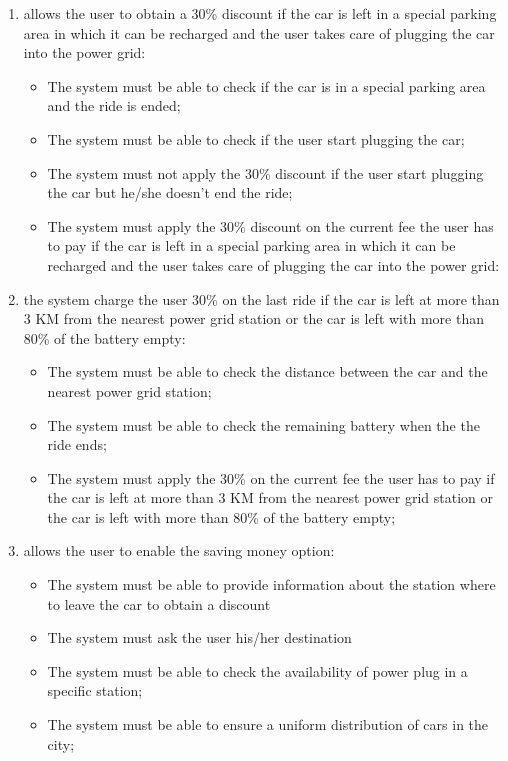 \begin{enumerate}
\item allows the user to obtain a 30\% discount if the car is left in a special parking area in which it can be recharged and the user takes care of plugging the car into the power grid:

\begin{itemize}
\item The system must be able to check if the car is in a special parking area and the ride is ended;
\item The system must be able to check if the user start plugging the car;
\item The system must not apply the 30\% discount if the user start plugging the car but he/she doesn't end the ride;
\item The system must apply the 30\% discount on the current fee the user has to pay if the car is left in a special parking area in which it can be recharged and the user takes care of plugging the car into the power grid:
\end{itemize}

\item the system charge the user 30\% on the last ride if the car is left at more than 3 KM from the nearest power grid station or the car is left with more than 80\% of the battery empty:

\begin{itemize}
\item The system must be able to check the distance between the car and the nearest power grid station;
\item The system must be able to check the remaining battery when the the ride ends;
\item The system must apply the 30\% on the current fee the user has to pay if the car is left at more than 3 KM from the nearest power grid station or the car is left with more than 80\% of the battery empty;
\end{itemize}

\item allows the user to enable the saving money option:

\begin{itemize}
\item The system must be able to provide information about the station where to leave the car to obtain a discount
\item The system must ask the user his/her destination
\item The system must be able to check the availability of power plug in a specific station;
\item The system must be able to ensure a uniform distribution of cars in the city;
\end{itemize}
\end{enumerate}
